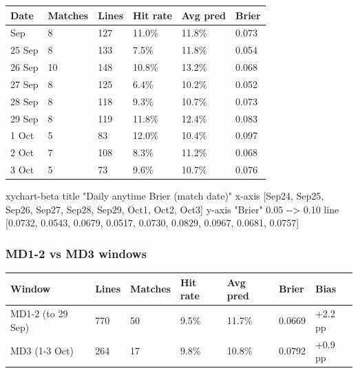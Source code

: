 \documentclass[
]{article}
\newenvironment{Shaded}{\begin{snugshade}}{\end{snugshade}}
\newcommand{\NormalTok}[1]{#1}
\newcounter{none} %
\begin{document}
{\def\LTcaptype{none} %
\begin{longtable}[]{@{}llllll@{}}
\toprule\noalign{}
Date & Matches & Lines & Hit rate & Avg pred & Brier \\
\midrule\noalign{}
\endhead
\bottomrule\noalign{}
\endlastfoot
24 Sep & 8 & 127 & 11.0\% & 11.8\% & 0.073 \\
25 Sep & 8 & 133 & 7.5\% & 11.8\% & 0.054 \\
26 Sep & 10 & 148 & 10.8\% & 13.2\% & 0.068 \\
27 Sep & 8 & 125 & 6.4\% & 10.2\% & 0.052 \\
28 Sep & 8 & 118 & 9.3\% & 10.7\% & 0.073 \\
29 Sep & 8 & 119 & 11.8\% & 12.4\% & 0.083 \\
1 Oct & 5 & 83 & 12.0\% & 10.4\% & 0.097 \\
2 Oct & 7 & 108 & 8.3\% & 11.2\% & 0.068 \\
3 Oct & 5 & 73 & 9.6\% & 10.7\% & 0.076 \\
\end{longtable}
}

\begin{Shaded}
\begin{Highlighting}[]
\NormalTok{xychart{-}beta}
\NormalTok{  title "Daily anytime Brier (match date)"}
\NormalTok{  x{-}axis [Sep24, Sep25, Sep26, Sep27, Sep28, Sep29, Oct1, Oct2, Oct3]}
\NormalTok{  y{-}axis "Brier" 0.05 {-}{-}\textgreater{} 0.10}
\NormalTok{  line [0.0732, 0.0543, 0.0679, 0.0517, 0.0730, 0.0829, 0.0967, 0.0681, 0.0757]}
\end{Highlighting}
\end{Shaded}

\subsubsection{MD1-2 vs MD3 windows}\label{md1-2-vs-md3-windows}

{\def\LTcaptype{none} %
\begin{longtable}[]{@{}lllllll@{}}
\toprule\noalign{}
Window & Lines & Matches & Hit rate & Avg pred & Brier & Bias \\
\midrule\noalign{}
\endhead
\bottomrule\noalign{}
\endlastfoot
MD1-2 (to 29 Sep) & 770 & 50 & 9.5\% & 11.7\% & 0.0669 & +2.2 pp \\
MD3 (1-3 Oct) & 264 & 17 & 9.8\% & 10.8\% & 0.0792 & +0.9 pp \\
\end{longtable}
}
\end{document}
